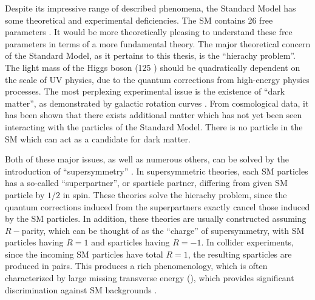 Despite its impressive range of described phenomena, the Standard Model has some theoretical and experimental deficiencies.
The SM contains 26 free parameters \footnotemark.
It would be more theoretically pleasing to understand these free parameters in terms of a more fundamental theory.
The major theoretical concern of the Standard Model, as it pertains to this thesis, is the ``hierachy problem''\cite {Weinberg:1975gm,Weinberg:1979bn, Gildener:1976ai, Susskind:1978ms, susyPrimer}.
The light mass of the Higgs boson (125 \GeV) should be quadratically dependent on the scale of UV physics, due to the quantum corrections from high-energy physics processes.
The most perplexing experimental issue is the existence of ``dark matter'', as demonstrated by galactic rotation curves \cite{Rubin:1970zza, Roberts:1970zza, Rubin:1980zd, Rubin:1985ze, Bosma:1981zz, Persic:1995ru, darkMatterPrimer}.
From cosmological data, it has been shown that there exists additional matter which has not yet been seen interacting with the particles of the Standard Model.
There is no particle in the SM which can act as a candidate for dark matter.

Both of these major issues, as well as numerous others, can be solved by the introduction of ``supersymmetry'' \cite{Miyazawa:1966mfa, Gervais:1971xj, Gervais:1971ji, Golfand:1971iw, Neveu:1971rx, Neveu:1971iv, Volkov:1973ix,  Wess:1973kz, Salam:1974ig, Ferrara:1974ac, Wess:1974tw, susyPrimer}.
In supersymmetric theories, each SM particles has a so-called ``superpartner'', or sparticle partner, differing from given SM particle by $1/2$ in spin.
These theories solve the hierachy problem, since the quantum corrections induced from the superpartners exactly cancel those induced by the SM particles.
In addition, these theories are usually constructed assuming $R-$parity, which can be thought of as the ``charge'' of supersymmetry, with SM particles having $R=1$ and sparticles having $R=-1$.
In collider experiments, since the incoming SM particles have total $R=1$, the resulting sparticles are produced in pairs.
This produces a rich phenomenology, which is often characterized by large missing transverse energy (\met), which provides significant discrimination against SM backgrounds \cite{Farrar:1978xj}.

